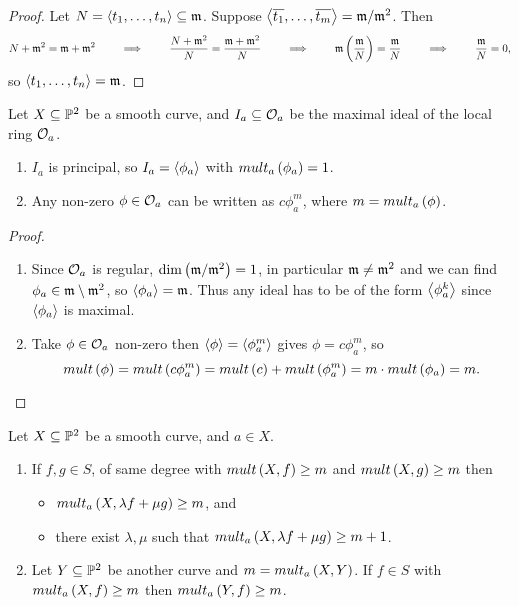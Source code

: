 \begin{proof}
Let $ N = \abr{t_1, \dots, t_n} \subseteq \mm $. Suppose $ \abr{\overline{t_1}, \dots, \overline{t_m}} = \mm / \mm^2 $. Then
$$ N + \mm^2 = \mm + \mm^2 \qquad \implies \qquad \dfrac{N + \mm^2}{N} = \dfrac{\mm + \mm^2}{N} \qquad \implies \qquad \mm\br{\dfrac{\mm}{N}} = \dfrac{\mm}{N} \qquad \implies \qquad \dfrac{\mm}{N} = 0, $$
so $ \abr{t_1, \dots, t_n} = \mm $.
\end{proof}

\begin{lemma}
Let $ X \subseteq \P^2 $ be a smooth curve, and $ I_a \subseteq \OO_a $ be the maximal ideal of the local ring $ \OO_a $.
\begin{enumerate}
\item $ I_a $ is principal, so $ I_a = \abr{\phi_a} $ with $ mult_a\br{\phi_a} = 1 $.
\item Any non-zero $ \phi \in \OO_a $ can be written as $ c\phi_a^m $, where $ m = mult_a\br{\phi} $.
\end{enumerate}
\end{lemma}

\begin{proof}
\hfill
\begin{enumerate}
\item Since $ \OO_a $ is regular, $ \dim\br{\mm / \mm^2} = 1 $, in particular $ \mm \ne \mm^2 $ and we can find $ \phi_a \in \mm \setminus \mm^2 $, so $ \abr{\phi_a} = \mm $. Thus any ideal has to be of the form $ \abr{\phi_a^k} $ since $ \abr{\phi_a} $ is maximal.
\item Take $ \phi \in \OO_a $ non-zero then $ \abr{\phi} = \abr{\phi_a^m} $ gives $ \phi = c\phi_a^m $, so
$$ mult\br{\phi} = mult\br{c\phi_a^m} = mult\br{c} + mult\br{\phi_a^m} = m \cdot mult\br{\phi_a} = m. $$
\end{enumerate}
\end{proof}

\begin{lemma}
Let $ X \subseteq \P^2 $ be a smooth curve, and $ a \in X $.
\begin{enumerate}
\item If $ f, g \in S $, of same degree with $ mult\br{X, f} \ge m $ and $ mult\br{X, g} \ge m $ then
\begin{itemize}
\item $ mult_a\br{X, \lambda f + \mu g} \ge m $, and
\item there exist $ \lambda, \mu $ such that $ mult_a\br{X, \lambda f + \mu g} \ge m + 1 $.
\end{itemize}
\item Let $ Y \subseteq \P^2 $ be another curve and $ m = mult_a\br{X, Y} $. If $ f \in S $ with $ mult_a\br{X, f} \ge m $ then $ mult_a\br{Y, f} \ge m $.
\end{enumerate}
\end{lemma}

